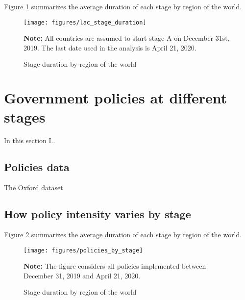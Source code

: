\documentclass[12pt,english]{article}
\begin{document}
Figure \ref{fig:stage_by_region} summarizes the average duration of each stage by region of the world.

\begin{figure}[H]
	\singlespacing
	\centering
	 \caption{Stage duration by region of the world}  \label{fig:stage_by_region}
	\resizebox{0.7\width}{!} {
		\begin{threeparttable}

 			  \texttt{[image: figures/lac\_stage\_duration]}
  			 \begin{tablenotes}[flushleft]\vspace*{-7bp}
			\item \textbf{Note:} All countries are assumed to start stage A on December 31st, 2019.  The last date used in the analysis is April 21, 2020.
			 \end{tablenotes}
  		\end{threeparttable}
 		}
  	 \onehalfspacing
\end{figure}



\section{Government policies at different stages \label{sec:Policies}}

In this section I..

\subsection{Policies data \label{subsec:Policies-data}}

The Oxford dataset

\subsection{How policy intensity varies by stage \label{subsec:Policies-by-stage}}

Figure \ref{fig:policies_by_stage} summarizes the average duration of each stage by region of the world.

\begin{figure}[H]
	\singlespacing
	\centering
	 \caption{Stage duration by region of the world}  \label{fig:policies_by_stage}
	\resizebox{0.7\width}{!} {
		\begin{threeparttable}

 			  \texttt{[image: figures/policies\_by\_stage]}
  			 \begin{tablenotes}[flushleft]\vspace*{-7bp}
			\item \textbf{Note:} The figure considers all policies implemented between December 31, 2019 and April 21, 2020.
			 \end{tablenotes}
  		\end{threeparttable}
 		}
  	 \onehalfspacing
\end{figure}
\end{document}
